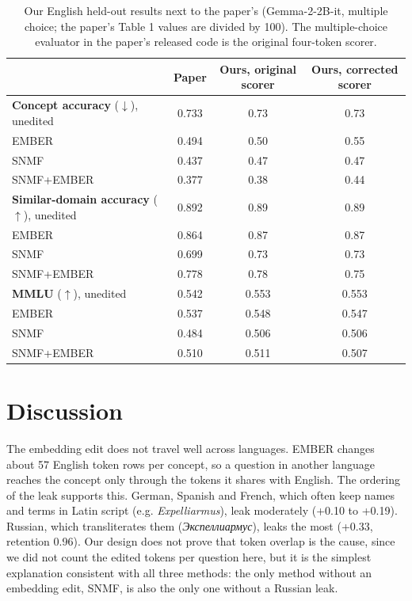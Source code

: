 \documentclass[11pt]{article}
\newcommand{\cyr}[1]{{\fontencoding{T2A}\fontfamily{cmr}\selectfont #1}}
\begin{document}
\begin{table}[t]
\centering\small
\begin{tabular}{@{}lccc@{}}
\toprule
 & Paper & Ours, original scorer & Ours, corrected scorer \\
\midrule
\textbf{Concept accuracy} ($\downarrow$), unedited & 0.733 & 0.73 & 0.73 \\
EMBER & 0.494 & 0.50 & 0.55 \\
SNMF & 0.437 & 0.47 & 0.47 \\
SNMF+EMBER & 0.377 & 0.38 & 0.44 \\
\midrule
\textbf{Similar-domain accuracy} ($\uparrow$), unedited & 0.892 & 0.89 & 0.89 \\
EMBER & 0.864 & 0.87 & 0.87 \\
SNMF & 0.699 & 0.73 & 0.73 \\
SNMF+EMBER & 0.778 & 0.78 & 0.75 \\
\midrule
\textbf{MMLU} ($\uparrow$), unedited & 0.542 & 0.553 & 0.553 \\
EMBER & 0.537 & 0.548 & 0.547 \\
SNMF & 0.484 & 0.506 & 0.506 \\
SNMF+EMBER & 0.510 & 0.511 & 0.507 \\
\bottomrule
\end{tabular}
\caption{Our English held-out results next to the paper's (Gemma-2-2B-it, multiple choice; the paper's Table 1 values are divided by 100). The multiple-choice evaluator in the paper's released code is the original four-token scorer.}
\label{tab:7}
\end{table}

\section{Discussion}\label{sec:6}

The embedding edit does not travel well across languages. EMBER changes about 57 English token rows per concept, so a question in another language reaches the concept only through the tokens it shares with English. The ordering of the leak supports this. German, Spanish and French, which often keep names and terms in Latin script (e.g. \emph{Expelliarmus}), leak moderately (+0.10 to +0.19). Russian, which transliterates them (\emph{\cyr{Экспеллиармус}}), leaks the most (+0.33, retention 0.96). Our design does not prove that token overlap is the cause, since we did not count the edited tokens per question here, but it is the simplest explanation consistent with all three methods: the only method without an embedding edit, SNMF, is also the only one without a Russian leak.
\end{document}
